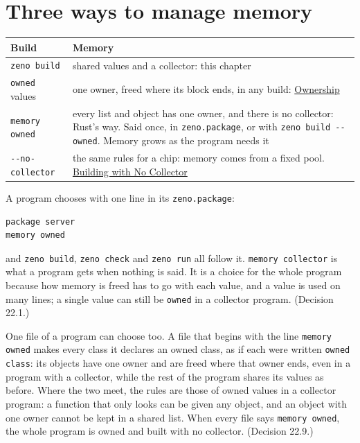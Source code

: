 \section{Three ways to manage memory}

\begin{center}
\begin{tabular}{lP{9cm}}
\toprule
Build & Memory \\
\midrule
\verb|zeno build| & shared values and a collector: this chapter \\
\verb|owned| values & one owner, freed where its block ends, in any build:
  \hyperref[ch-ownership]{Ownership} \\
\verb|memory owned| & every list and object has one owner, and there is
  no collector: Rust's way. Said once, in \verb|zeno.package|, or with
  \verb|zeno build --owned|. Memory grows as the program needs it \\
\verb|--no-collector| & the same rules for a chip: memory comes from a
  fixed pool. \hyperref[ch-no-collector]{Building with No Collector} \\
\bottomrule
\end{tabular}
\end{center}

A program chooses with one line in its \verb|zeno.package|:

\begin{verbatim}
package server
memory owned
\end{verbatim}

\noindent and \verb|zeno build|, \verb|zeno check| and \verb|zeno run|
all follow it. \verb|memory collector| is what a program gets when
nothing is said. It is a choice for the whole program because how
memory is freed has to go with each value, and a value is used on many
lines; a single value can still be \verb|owned| in a collector program.
(Decision 22.1.)

One file of a program can choose too. A file that begins with the line
\verb|memory owned| makes every class it declares an owned class, as if
each were written \verb|owned class|: its objects have one owner and are
freed where that owner ends, even in a program with a collector, while
the rest of the program shares its values as before. Where the two
meet, the rules are those of owned values in a collector program: a
function that only looks can be given any object, and an object with
one owner cannot be kept in a shared list. When every file says
\verb|memory owned|, the whole program is owned and built with no
collector. (Decision 22.9.)

